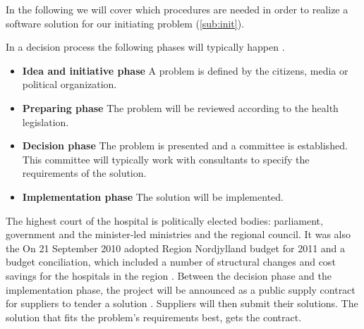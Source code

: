 In the following we will cover which procedures are needed in order to realize a software solution for our initiating problem (\cref{sub:init}).

In a decision process the following phases will typically happen \cite{Sjaelland}.


\begin{itemize}
  \setlength{\itemsep}{1pt}
  \setlength{\parskip}{0pt}
  \setlength{\parsep}{0pt}
	\item \textbf{Idea and initiative phase} A problem is defined by the citizens, media or political organization.
	\item \textbf{Preparing phase} The problem will be reviewed according to the health legislation.
	\item \textbf{Decision phase} The problem is presented and a committee is established. This committee will typically work with consultants to specify the requirements of the solution.
	\item \textbf{Implementation phase} The solution will be implemented. 
\end{itemize}

The highest court of the hospital is politically elected bodies: parliament, government and the minister-led ministries and the regional council. It was also the On 21 September 2010 adopted Region Nordjylland budget for 2011 and a budget conciliation, which included a number of structural changes and cost savings for the hospitals in the region \cite{politisk_styret_ca}. Between the decision phase and the implementation phase, the project will be announced as a public supply contract for suppliers to tender a solution \cite{Union2004}. Suppliers will then submit their solutions. The solution that fits the problem's requirements best, gets the contract. 
